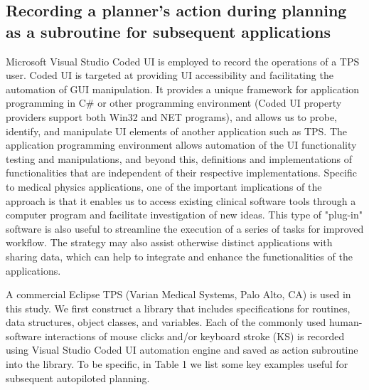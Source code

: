 \subsection{Recording a planner's action during planning as a subroutine for subsequent applications} 
Microsoft Visual Studio Coded UI is employed to record the operations of a TPS user\cite{website2015, johnson2015}. Coded UI is targeted at providing UI accessibility and facilitating the automation of GUI manipulation. It provides a unique framework for application programming in C\# or other programming environment (Coded UI property providers support both Win32 and NET programs), and allows us to probe, identify, and manipulate UI elements of another application such as TPS. The application programming environment allows automation of the UI functionality testing and manipulations, and beyond this, definitions and implementations of functionalities that are independent of their respective implementations. Specific to medical physics applications, one of the important implications of the approach is that it enables us to access existing clinical software tools through a computer program and facilitate investigation of new ideas. This type of "plug-in" software is also useful to streamline the execution of a series of tasks for improved workflow. The strategy may also assist otherwise distinct applications with sharing data, which can help to integrate and enhance the functionalities of the applications.

A commercial Eclipse TPS (Varian Medical Systems, Palo Alto, CA) is used in this study.  We first construct a library that includes specifications for routines, data structures, object classes, and variables.  Each of the commonly used human-software interactions of mouse clicks and/or keyboard stroke (KS) is recorded using Visual Studio Coded UI automation engine and saved as action subroutine into the library. To be specific, in Table 1 we list some key examples useful for subsequent autopiloted planning.

